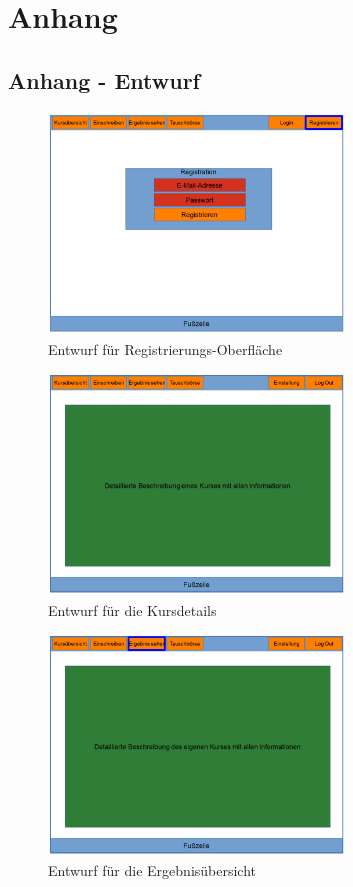 \clearpage
\chapter{Anhang}
\label{chapter:appendix}
    \section{Anhang - Entwurf}
        \begin{figure}[t]
            \centering
            \includegraphics[width=0.7\textwidth]{./design/images/MockUpsFrontend/frontendRegistration.png}
            \caption{Entwurf für Registrierungs-Oberfläche}
            \label{fig:mockupRegistrationFrontend}
        \end{figure}
        
        \begin{figure}[t]
        	\centering
        	\includegraphics[width=0.7\textwidth]{./design/images/MockUpsFrontend/frontendCoursedetails.png}
        	\caption{Entwurf für die Kursdetails}
        	\label{fig:mockupDetailsFrontend}
        \end{figure}
    
        \begin{figure}[t]
        	\centering
        	\includegraphics[width=0.7\textwidth]{./design/images/MockUpsFrontend/frontendResults.png}
        	\caption{Entwurf für die Ergebnisübersicht}
        	\label{fig:mockupResultsFrontend}
        \end{figure}
    
        